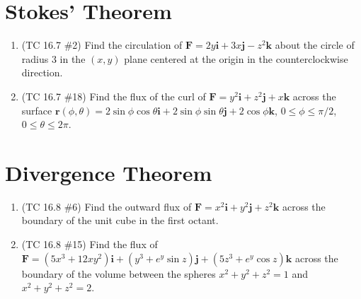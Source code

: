 \documentclass[letterpaper, 11pt]{article}
\begin{document}
\section{Stokes' Theorem}
\begin{enumerate}
\item (TC 16.7 \#2) Find the circulation of $\bm{F} = 2y \bm{i} + 3x \bm{j} - z^2 \bm{k}$ about the circle of radius 3 in the $(x,y)$ plane centered at the origin in the counterclockwise direction. 


\item (TC 16.7 \#18) Find the flux of the curl of $\bm{F} = y^2 \bm{i} + z^2 \bm{j} + x \bm{k}$ across the surface $\bm{r}(\phi,\theta) = 2 \sin \phi \cos \theta \bm{i} + 2 \sin \phi\sin \theta\bm{j} + 2\cos \phi \bm{k}$, $ 0 \leq \phi \leq \pi/2$, $0 \leq \theta \leq 2 \pi$. 

\end{enumerate}

\section{Divergence Theorem}
\begin{enumerate}
\item (TC 16.8 \#6) Find the outward flux of $\bm{F} = x^2 \bm{i} + y^2 \bm{j} + z^2 \bm{k}$ across the boundary of the unit cube in the first octant. 



\item (TC 16.8 \#15) Find the flux of $\bm{F} = (5x^3 + 12xy^2)\bm{i} + (y^3+ e^y\sin z)\bm{j} + (5z^3 + e^y \cos z)\bm{k}$ across the boundary of the volume between the spheres $x^2 + y^2 + z^2 =1 $ and $x^2 + y^2 + z^2 = 2$.


\end{enumerate}
\end{document}
